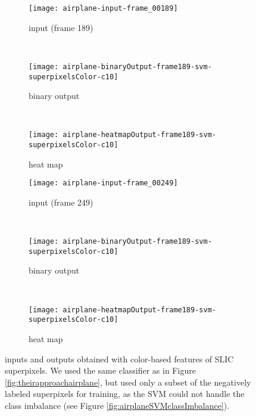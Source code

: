 \begin{figure}[ht]
	\centering
	\begin{subfigure}[h]{0.31\textwidth}
		\texttt{[image: airplane-input-frame\_00189]}
		\caption*{input (frame 189)}
	\end{subfigure}
	~
	\begin{subfigure}[h]{0.31\textwidth}
		\texttt{[image: airplane-binaryOutput-frame189-svm-superpixelsColor-c10]}	
		\caption*{binary output}
	\end{subfigure}
	~
	\begin{subfigure}[h]{0.31\textwidth}
		\texttt{[image: airplane-heatmapOutput-frame189-svm-superpixelsColor-c10]}	
		\caption*{heat map}
	\end{subfigure}
	
	\vspace{3mm}
	\begin{subfigure}[h]{0.31\textwidth}
		\texttt{[image: airplane-input-frame\_00249]}	
		\caption*{input (frame 249)}
	\end{subfigure}
	~
	\begin{subfigure}[h]{0.31\textwidth}
		\texttt{[image: airplane-binaryOutput-frame189-svm-superpixelsColor-c10]}	
		\caption*{binary output}
	\end{subfigure}	
	~
	\begin{subfigure}[h]{0.31\textwidth}
		\texttt{[image: airplane-heatmapOutput-frame189-svm-superpixelsColor-c10]}	
		\caption*{heat map}
	\end{subfigure}	
	\caption{inputs and outputs obtained with color-based features of SLIC superpixels. We used the same classifier as in Figure \ref{fig:theirapproachairplane}, but used only a subset of the negatively labeled superpixels for training, as the SVM could not handle the class imbalance (see Figure \ref{fig:airplaneSVMclassImbalance}). }
	\label{fig:airplaneSLIC}
\end{figure}



